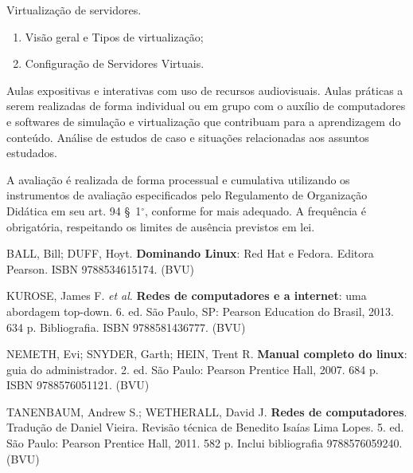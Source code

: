 \begin{pud}
\begin{description}[itemsep=0em]
         \item[UNIDADE V:]  Virtualização de servidores.
	         \begin{enumerate}[itemsep=0em, topsep=0em]
				\item Visão geral e Tipos de virtualização;
                \item Configuração de Servidores Virtuais.
            \end{enumerate}

	\end{description}
	
	\clearpage
	
	
	\metodologia
	Aulas expositivas e interativas com uso de recursos audiovisuais. Aulas práticas a serem realizadas de forma individual ou em grupo com o auxílio de computadores e softwares de simulação e virtualização que contribuam para a aprendizagem do conteúdo. Análise de estudos de caso e situações relacionadas aos assuntos estudados.
	
	
	\avaliacao
	A avaliação é realizada de forma processual e cumulativa utilizando os instrumentos de avaliação especificados pelo Regulamento de Organização Didática em seu art. 94 \S~1$^\circ$, conforme for mais adequado. A frequência é obrigatória, respeitando os limites de ausência previstos em lei.
	
		
	\begin{bibbasica}
		\item BALL, Bill; DUFF, Hoyt. \textbf{Dominando Linux}: Red Hat e Fedora. Editora Pearson. ISBN 9788534615174. (BVU)
		\item KUROSE, James F. \textit{et al}. \textbf{Redes de computadores e a internet}: uma abordagem top-down. 6. ed. São Paulo, SP: Pearson Education do Brasil, 2013. 634 p. Bibliografia. ISBN 9788581436777. (BVU)
		\item NEMETH, Evi; SNYDER, Garth; HEIN, Trent R. \textbf{Manual completo do linux}: guia do administrador. 2. ed. São Paulo: Pearson Prentice Hall, 2007. 684 p. ISBN 9788576051121. (BVU)
		
		\item TANENBAUM, Andrew S.; WETHERALL, David J.  \textbf{Redes de computadores}. Tradução de Daniel Vieira. Revisão técnica de Benedito Isaías Lima Lopes. 5. ed. São Paulo: Pearson Prentice Hall, 2011. 582 p. Inclui bibliografia 9788576059240. (BVU) 

		
	\end{bibbasica}
	
	\begin{bibcomplementar}
	

\end{bibcomplementar}
\end{pud}
